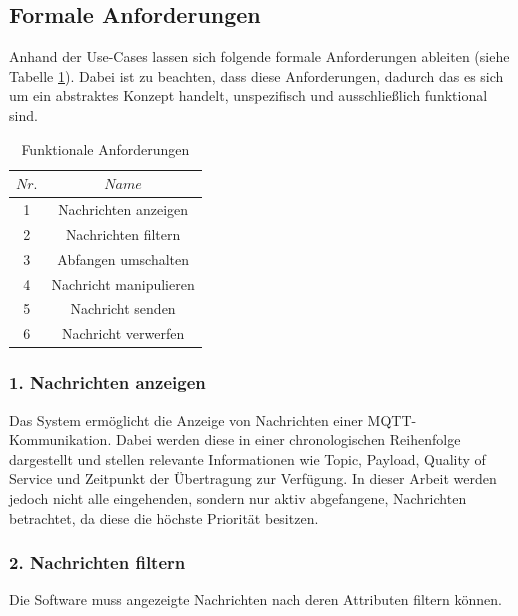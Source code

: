     \subsection{Formale Anforderungen} \label{FormaleAnforderungen}
    Anhand der Use-Cases lassen sich folgende formale Anforderungen ableiten (siehe Tabelle \ref{tab:functional_requirements}).
    Dabei ist zu beachten, dass diese Anforderungen, dadurch das es sich um ein abstraktes Konzept handelt, unspezifisch und ausschließlich funktional sind.
    \begin{table}[h]
        \centering
        \begin{tabular}{c|c}
            \hline
            $Nr.$ & $Name$ \\ \hline
            1 & Nachrichten anzeigen \\ \hline
            2 & Nachrichten filtern \\ \hline
            3 & Abfangen umschalten \\ \hline
            4 & Nachricht manipulieren \\ \hline
            5 & Nachricht senden \\ \hline
            6 & Nachricht verwerfen \\ \hline
        \end{tabular}
        \caption{Funktionale Anforderungen}
        \label{tab:functional_requirements}
    \end{table}
    
        \subsubsection{1. Nachrichten anzeigen}
        Das System ermöglicht die Anzeige von Nachrichten einer \ac{MQTT}-Kommunikation.
        Dabei werden diese in einer chronologischen Reihenfolge dargestellt und stellen relevante Informationen wie Topic, Payload, Quality of Service und Zeitpunkt der Übertragung zur Verfügung.
        In dieser Arbeit werden jedoch nicht alle eingehenden, sondern nur aktiv abgefangene, Nachrichten betrachtet, da diese die höchste Priorität besitzen.
        
        \subsubsection{2. Nachrichten filtern}
        Die Software muss angezeigte Nachrichten nach deren Attributen filtern können.
        
